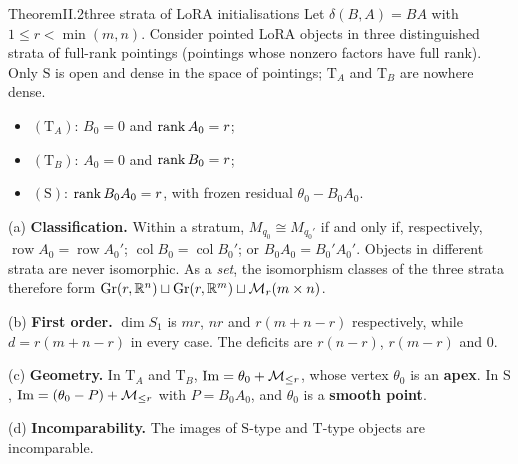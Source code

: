 \begin{restate}{Theorem}{II.2}{three strata of LoRA initialisations}
Let $\delta(B,A)=BA$ with $1\le r<\min(m,n)$. Consider pointed LoRA objects in three distinguished strata of full-rank
pointings (pointings whose nonzero factors have full rank). Only $\mathrm S$ is open and dense in the space of pointings;
$\mathrm T_A$ and $\mathrm T_B$ are nowhere dense.
\begin{itemize}
  \item $(\mathrm T_A)$: $B_0=0$ and $\operatorname{rank} A_0=r$;
  \item $(\mathrm T_B)$: $A_0=0$ and $\operatorname{rank} B_0=r$;
  \item $(\mathrm S)$: $\operatorname{rank} B_0A_0=r$, with frozen residual $\theta_0-B_0A_0$.
\end{itemize}

(a) \textbf{Classification.} Within a stratum, $M_{q_0}\cong M_{q_0'}$ if and only if, respectively,
$\operatorname{row}A_0=\operatorname{row}A_0'$; $\operatorname{col}B_0=\operatorname{col}B_0'$; or $B_0A_0=B_0'A_0'$.
Objects in different strata are never isomorphic. As a \emph{set}, the isomorphism classes of the three strata therefore
form $\operatorname{Gr}(r,\mathbb{R}^n)\sqcup\operatorname{Gr}(r,\mathbb{R}^m)\sqcup\mathcal{M}_r(m\times n)$.

(b) \textbf{First order.} $\dim S_1$ is $mr$, $nr$ and $r(m+n-r)$ respectively, while $d=r(m+n-r)$ in every case. The
deficits are $r(n-r)$, $r(m-r)$ and $0$.

(c) \textbf{Geometry.} In $\mathrm T_A$ and $\mathrm T_B$, $\operatorname{Im}=\theta_0+\mathcal{M}_{\le r}$, whose vertex $\theta_0$ is an
\textbf{apex}. In $\mathrm S$, $\operatorname{Im}=(\theta_0-P)+\mathcal{M}_{\le r}$ with $P=B_0A_0$, and $\theta_0$ is a \textbf{smooth point}.

(d) \textbf{Incomparability.} The images of $\mathrm S$-type and $\mathrm T$-type objects are incomparable.


\end{restate}
